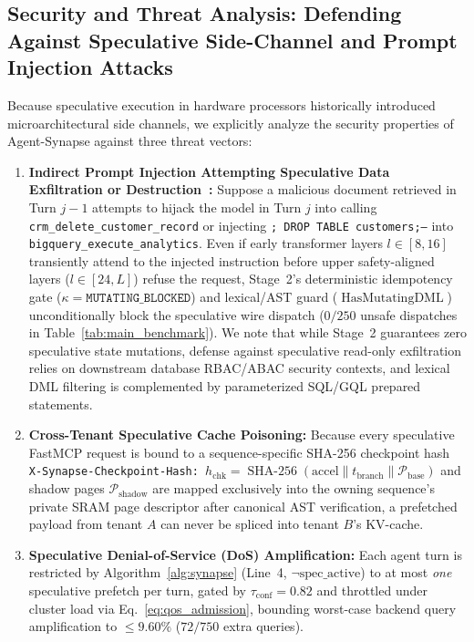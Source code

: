 \documentclass[10pt,conference]{IEEEtran}
\begin{document}
\subsection{Security and Threat Analysis: Defending Against Speculative Side-Channel and Prompt Injection Attacks}
Because speculative execution in hardware processors historically introduced microarchitectural side channels, we explicitly analyze the security properties of Agent-Synapse against three threat vectors:
\begin{enumerate}
    \item \textbf{Indirect Prompt Injection Attempting Speculative Data Exfiltration or Destruction~\cite{debenedetti2025camel}:} Suppose a malicious document retrieved in Turn $j-1$ attempts to hijack the model in Turn $j$ into calling \texttt{crm\_delete\_customer\_record} or injecting \texttt{; DROP TABLE customers;--} into \texttt{bigquery\_execute\_analytics}. Even if early transformer layers $l \in [8, 16]$ transiently attend to the injected instruction before upper safety-aligned layers ($l \in [24, L]$) refuse the request, Stage~2's deterministic idempotency gate ($\kappa = \texttt{MUTATING\_BLOCKED}$) and lexical/AST guard ($\operatorname{HasMutatingDML}$) unconditionally block the speculative wire dispatch ($0/250$ unsafe dispatches in Table~\ref{tab:main_benchmark}). We note that while Stage~2 guarantees zero speculative state mutations, defense against speculative read-only exfiltration relies on downstream database RBAC/ABAC security contexts, and lexical DML filtering is complemented by parameterized SQL/GQL prepared statements.
    \item \textbf{Cross-Tenant Speculative Cache Poisoning:} Because every speculative FastMCP request is bound to a sequence-specific SHA-256 checkpoint hash \texttt{X-Synapse-Checkpoint-Hash: }$h_{\text{chk}} = \operatorname{SHA-256}(\text{accel} \parallel t_{\text{branch}} \parallel \mathcal{P}_{\text{base}})$ and shadow pages $\mathcal{P}_{\text{shadow}}$ are mapped exclusively into the owning sequence's private SRAM page descriptor after canonical AST verification, a prefetched payload from tenant $A$ can never be spliced into tenant $B$'s KV-cache.
    \item \textbf{Speculative Denial-of-Service (DoS) Amplification:} Each agent turn is restricted by Algorithm~\ref{alg:synapse} (Line~4, $\neg\text{spec\_active}$) to at most \emph{one} speculative prefetch per turn, gated by $\tau_{\text{conf}} = 0.82$ and throttled under cluster load via Eq.~\eqref{eq:qos_admission}, bounding worst-case backend query amplification to $\le 9.60\%$ ($72/750$ extra queries).
\end{enumerate}
\end{document}
